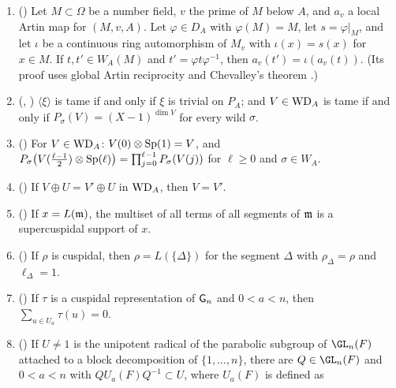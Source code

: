 \begin{enumerate}[label=(F\arabic*),leftmargin=3em]
  is a number field and $w'$ a prime of $\OO_{E'}$ with $A$ above $w'$, $\Nm w'=g^n$ ($n\ge1$) and
  $g\notin w'^2$, then every element of $I_A$ fixes $E'$ pointwise, hence lies in $I_A(E')$.
\item\label{pf:llc:F-transport} () Let $M\subset\Omega$
  be a number field, $v$ the prime of $M$ below $A$, and $a_v$ a local Artin map for $(M,v,A)$. Let $\varphi\in
  D_A$ with $\varphi(M)=M$, let $s=\varphi|_M$, and let $\iota$ be a continuous ring automorphism of $M_v$ with
  $\iota(x)=s(x)$ for $x\in M$. If $t,t'\in W_A(M)$ and $t'=\varphi t\varphi^{-1}$, then $a_v(t')=\iota(a_v(t))$.
  (Its proof uses global Artin reciprocity and Chevalley's theorem \cite{Chevalley1951}.)
\item\label{pf:llc:F-tamechar} (,
  ) $\langle\xi\rangle$ is tame if and only if
  $\xi$ is trivial on $P_A$; and $V\in\mathrm{WD}_A$ is tame if and only if $P_\sigma(V)=(X-1)^{\dim V}$ for every
  wild $\sigma$.
\item\label{pf:llc:F-sp} () For $V\in\mathrm{WD}_A$:
  $V(0)\otimes\operatorname{Sp}(1)=V$, and $P_\sigma\bigl(V(\tfrac{\ell-1}2)\otimes\operatorname{Sp}(\ell)\bigr)=
  \prod_{j=0}^{\ell-1}P_\sigma(V(j))$ for $\ell\ge0$ and $\sigma\in W_A$.
\item\label{pf:llc:F-cancel} () If $V\oplus U=V'\oplus U$
  in $\mathrm{WD}_A$, then $V=V'$.
\item\label{pf:llc:F-msupp} () If $x=L(\mathfrak m)$, the
  multiset of all terms of all segments of $\mathfrak m$ is a supercuspidal support of $x$.
\item\label{pf:llc:F-single} () If $\rho$ is cuspidal, then
  $\rho=L(\{\Delta\})$ for the segment $\Delta$ with $\rho_\Delta=\rho$ and $\ell_\Delta=1$.
\item\label{pf:llc:F-unip} () If $\tau$ is a cuspidal
  representation of $\mathsf{G}_n$ and $0<a<n$, then $\sum_{u\in U_a}\tau(u)=0$.
\item\label{pf:llc:F-perm} () If $U\neq1$ is the
  unipotent radical of the parabolic subgroup of $\GL_n(F)$ attached to a block decomposition of
  $\{1,\dots,n\}$, there are $Q\in\GL_n(F)$ and $0<a<n$ with $QU_a(F)Q^{-1}\subset U$, where $U_a(F)$ is defined as

\end{enumerate}
